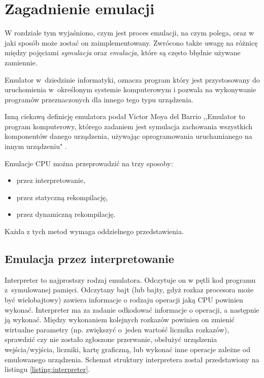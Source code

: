 \chapter{Zagadnienie emulacji}

    W rozdziale tym wyjaśniono, czym jest proces emulacji, na czym polega, oraz w jaki sposób może zostać on zaimplementowany. Zwrócono także uwagę na różnicę między pojęciami \emph{symulacja} oraz \emph{emulacja}, które są często błędnie używane zamiennie.

	Emulator w~dziedzinie informatyki, oznacza program który jest przystosowany do uruchomienia w~określonym systemie komputerowym i pozwala na wykonywanie programów przeznaczonych dla innego tego typu urządzenia\cite{howDoIWriteAnEmulator}. 
	
	Inną ciekawą definicję emulatora podał Victor Moya del Barrio ,,Emulator to program komputerowy, którego zadaniem jest symulacja zachowania wszystkich komponentów danego urządzenia, używając oprogramowania uruchamianego na innym urządzeniu" 
	\cite{studyofthetechniquesforemulationprogramming}.
		
	Emulacje CPU można przeprowadzić na trzy sposoby:\cite{fms_komkon_org_howto}	
	\begin{itemize}  
		\item przez interpretowanie,
		\item przez statyczną rekompilację,
		\item przez dynamiczną rekompilację.
	\end{itemize} 
	Każda z tych metod wymaga oddzielnego przedstawienia.
	
	\section{Emulacja przez interpretowanie}
	Interpreter to najprostszy rodzaj emulatora. Odczytuje on w pętli kod programu z~symulowanej pamięci. Odczytany bajt (lub bajty, gdyż rozkaz procesora może być wielobajtowy) zawiera informacje o rodzaju operacji jaką CPU 
	powinien wykonać. Interpreter ma za zadanie odkodować informacje o operacji, a następnie ją wykonać. Między wykonaniem kolejnych rozkazów powinien on zmienić wirtualne parametry (np. zwiększyć o~jeden wartość licznika rozkazów), sprawdzić czy nie zostało zgłoszone przerwanie, obsłużyć urządzenia wejścia/wyjścia, liczniki, kartę graficzną, lub wykonać inne operacje zależne od emulowanego urządzenia. Schemat struktury interpretera został przedstawiony na listingu \ref{listing:interpreter}.
	
